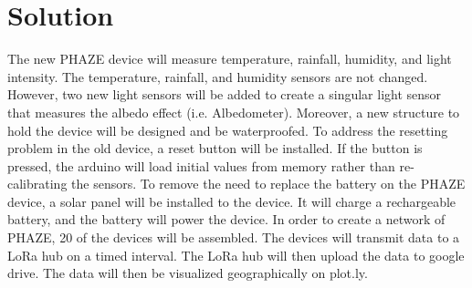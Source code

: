 \documentclass[onecolumn, draftclsnofoot,10pt, compsoc]{IEEEtran}
\begin{document}
\section {Solution}
The new PHAZE device will measure temperature, rainfall, humidity, and light intensity. The temperature, rainfall, and humidity sensors are not changed. However, two new light sensors will be added to create a singular light sensor that measures the albedo effect (i.e. Albedometer). Moreover, a new structure to hold the device will be designed and be waterproofed.
\newline
To address the resetting problem in the old device, a reset button will be installed. If the button is pressed, the arduino will load initial values from memory rather than re-calibrating the sensors.
\newline
To remove the need to replace the battery on the PHAZE device, a solar panel will be installed to the device. It will charge a rechargeable battery, and the battery will power the device.
\newline
In order to create a network of PHAZE, 20 of the devices will be assembled. The devices will transmit data to a LoRa hub on a timed interval. The LoRa hub will then upload the data to google drive. The data will then be visualized geographically on plot.ly.

\newpage
\end{document}

